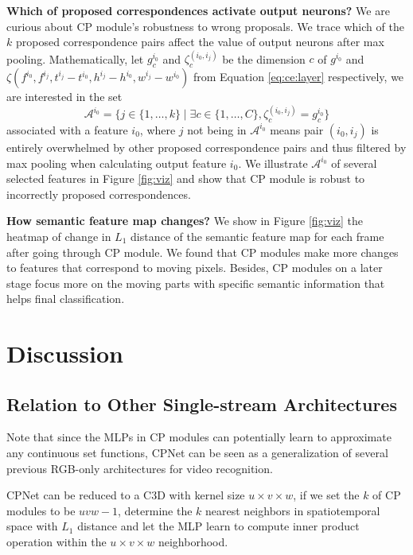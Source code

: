 \documentclass[10pt,twocolumn,letterpaper]{article}
\begin{document}
\textbf{Which of proposed correspondences activate output neurons?} We are curious about CP module's robustness to wrong proposals. We trace which of the $k$ proposed correspondence pairs affect the value of output neurons after max pooling. Mathematically, let $g_c^{i_0}$ and $\zeta^{(i_0, i_j)}_c$ be the dimension $c$ of $g^{i_0}$ and $\zeta(f^{i_0}, f^{i_j}, t^{i_j}-t^{i_0},h^{i_j}-h^{i_0},w^{i_j}-w^{i_0})$ from Equation \eqref{eq:ce:layer} respectively, we are interested in the set
\begin{equation}\label{eq:activate:neighbor}
\mathcal{A}^{i_0} =\{j \in \{1,\ldots,k\} \mid \exists c\in \{1,\ldots,C\}, \zeta^{(i_0, i_j)}_c = g_c^{i_0} \}
\end{equation}
associated with a feature $i_0$, where $j$ not being in $\mathcal{A}^{i_0}$ means pair $(i_0,i_j)$ is entirely overwhelmed by other proposed correspondence pairs and thus filtered by max pooling when calculating output feature $i_0$. We illustrate $\mathcal{A}^{i_0}$ of several selected features in Figure \ref{fig:viz} and show that CP module is robust to incorrectly proposed correspondences. 


\textbf{How semantic feature map changes?} We show in Figure \ref{fig:viz} the heatmap of change in $L_1$ distance of the semantic feature map for each frame after going through CP module.
We found that CP modules make more changes to features that correspond to moving pixels. Besides, CP modules on a later stage focus more on the moving parts with specific semantic information that helps final classification.






\section{Discussion}


\subsection{Relation to Other Single-stream Architectures}

Note that since the MLPs in CP modules can potentially learn to approximate any continuous set functions, CPNet can be seen as a generalization of several previous RGB-only architectures for video recognition. 

CPNet can be reduced to a C3D  \cite{C3D} with kernel size $u\times v\times w$, if we set the $k$ of CP modules to be $uvw-1$, determine the $k$ nearest neighbors in spatiotemporal space with $L_1$ distance and let the MLP learn to compute inner product operation within the  $u\times v\times w$ neighborhood.
\end{document}
